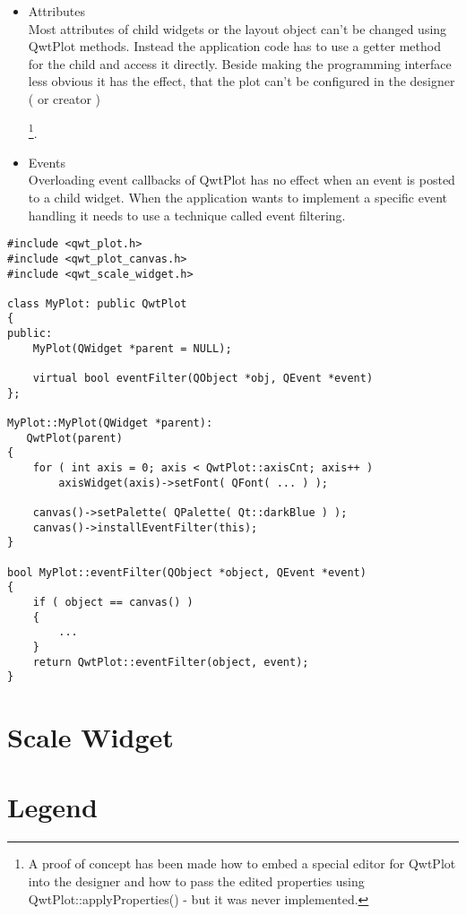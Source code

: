 \documentclass[12pt,a4paper]{book}
\begin{document}
\begin{itemize}

\item Attributes\\
Most attributes of child widgets or the layout object can't be 
changed using QwtPlot methods. Instead the application code has to 
use a getter method for the child and access it directly. 
Beside making the programming interface less obvious it has the effect, 
that the plot can't be configured in the designer ( or creator )

\footnote{A proof of concept has been made how to embed a special 
editor for QwtPlot into the designer and how to pass the edited 
properties using QwtPlot::applyProperties() - but it was never implemented.}.

\item Events\\
Overloading event callbacks of QwtPlot has no effect when an event is posted to a child widget. When the application wants to implement a specific event handling it needs to use a technique called event filtering.

\end{itemize}

\begin{lstlisting}
#include <qwt_plot.h>
#include <qwt_plot_canvas.h>
#include <qwt_scale_widget.h>

class MyPlot: public QwtPlot
{
public:
    MyPlot(QWidget *parent = NULL);
    
    virtual bool eventFilter(QObject *obj, QEvent *event)
};

MyPlot::MyPlot(QWidget *parent):
   QwtPlot(parent)
{
    for ( int axis = 0; axis < QwtPlot::axisCnt; axis++ )
    	axisWidget(axis)->setFont( QFont( ... ) );

	canvas()->setPalette( QPalette( Qt::darkBlue ) );
    canvas()->installEventFilter(this);
} 

bool MyPlot::eventFilter(QObject *object, QEvent *event)
{
    if ( object == canvas() )
    {
        ...
    }
    return QwtPlot::eventFilter(object, event);
}
\end{lstlisting}


\section{Scale Widget}
\section{Legend}
\end{document}
